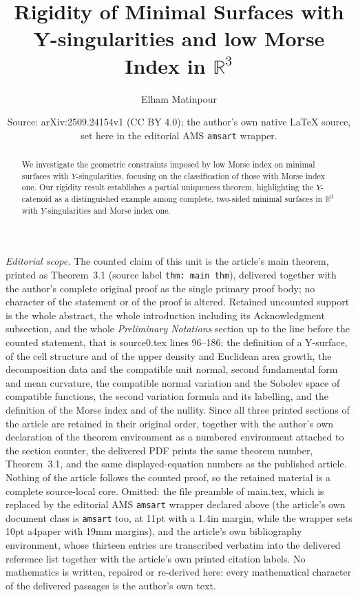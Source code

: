 \documentclass[10pt,a4paper]{amsart}
\title{Rigidity of Minimal Surfaces with Y-singularities and low Morse Index in $\mathbb{R}^3$}
\author{Elham Matinpour}
\date{Source: arXiv:2509.24154v1 (CC BY 4.0); the author's own native \LaTeX{} source, set here in the editorial AMS \texttt{amsart} wrapper.}
\theoremstyle{theorem}
\theoremstyle{definition}
\numberwithin{equation}{section}
\begin{document}
\maketitle
\noindent\textit{Editorial scope.} The counted claim of this unit is the article's main theorem, printed as Theorem~3.1 (source label \texttt{thm: main thm}), delivered together with the author's complete original proof as the single primary proof body; no character of the statement or of the proof is altered. Retained uncounted support is the whole abstract, the whole introduction including its Acknowledgment subsection, and the whole \emph{Preliminary Notations} section up to the line before the counted statement, that is source0.tex lines 96--186: the definition of a Y-surface, of the cell structure and of the upper density and Euclidean area growth, the decomposition data and the compatible unit normal, second fundamental form and mean curvature, the compatible normal variation and the Sobolev space of compatible functions, the second variation formula and its labelling, and the definition of the Morse index and of the nullity. Since all three printed sections of the article are retained in their original order, together with the author's own declaration of the theorem environment as a numbered environment attached to the section counter, the delivered PDF prints the same theorem number, Theorem~3.1, and the same displayed-equation numbers as the published article. Nothing of the article follows the counted proof, so the retained material is a complete source-local core. Omitted: the file preamble of main.tex, which is replaced by the editorial AMS \texttt{amsart} wrapper declared above (the article's own document class is \texttt{amsart} too, at 11pt with a 1.4in margin, while the wrapper sets 10pt a4paper with 19mm margins), and the article's own bibliography environment, whose thirteen entries are transcribed verbatim into the delivered reference list together with the article's own printed citation labels. No mathematics is written, repaired or re-derived here: every mathematical character of the delivered passages is the author's own text.
\begin{abstract}  
We investigate the geometric constraints imposed by low Morse index on minimal surfaces with $Y$-singularities, focusing on the classification of those with Morse index one. Our rigidity result establishes a partial uniqueness theorem, highlighting the $Y$-catenoid as a distinguished example among complete, two-sided minimal surfaces in $\mathbb{R}^3$ with $Y$-singularities and Morse index one.
\end{abstract}
\end{document}
